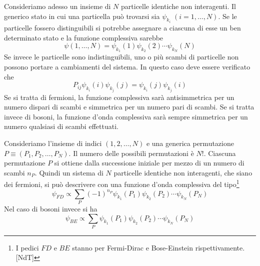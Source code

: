 Consideriamo adesso un insieme di $N$ particelle identiche non interagenti. Il
generico stato in cui una particella può trovarsi sia
$\psi_{k_i}\;(i=1,\dots,N)$. Se le particelle fossero distinguibili si potrebbe
assegnare a ciascuna di esse un ben determinato stato e la funzione complessiva
sarebbe
\[
\psi(1,\dots,N) = \psi_{k_1}(1)\psi_{k_2}(2)\cdots\psi_{k_N}(N)
\]
Se invece le particelle sono indistinguibili, uno o più scambi di particelle non
possono portare a cambiamenti del sistema. In questo caso deve essere verificato
che
\begin{equation}
 P_{ij}\psi_{k_i}(i)\psi_{k_j}(j) = \psi_{k_i}(j)\psi_{k_j}(i)
\end{equation}
Se si tratta di fermioni, la funzione complessiva sarà antisimmetrica per un
numero dispari di scambi e simmetrica per un numero pari di scambi. Se si tratta
invece di bosoni, la funzione d'onda complessiva sarà sempre simmetrica per un
numero qualsiasi di scambi effettuati.

Consideriamo l'insieme di indici $(1,2,\dots,N)$ e una generica permutazione
$P\equiv (P_1,P_2,\dots,P_N)$. Il numero delle possibili permutazioni è $N!$.
Ciascuna permutazione $P$ si ottiene dalla successione iniziale per mezzo di un
numero di scambi $n_P$. Quindi un sistema di $N$ particelle identiche non
interagenti, che siano dei fermioni, si può descrivere con una funzione d'onda
complessiva del tipo\footnote{I pedici $FD$ e $BE$ stanno per Fermi-Dirac e
Bose-Einstein rispettivamente. [NdT]}
\begin{equation}
 \psi_{FD} \propto \sum\limits_P(-1)^{n_P}\psi_{k_1}(P_1)\psi_{k_2}(P_2)\cdots\psi_{k_N}(P_N)
\end{equation}
Nel caso di bosoni invece si ha
\begin{equation}
 \psi_{BE} \propto \sum\limits_P\psi_{k_1}(P_1)\psi_{k_2}(P_2)\cdots\psi_{k_N}(P_N)
\end{equation}

